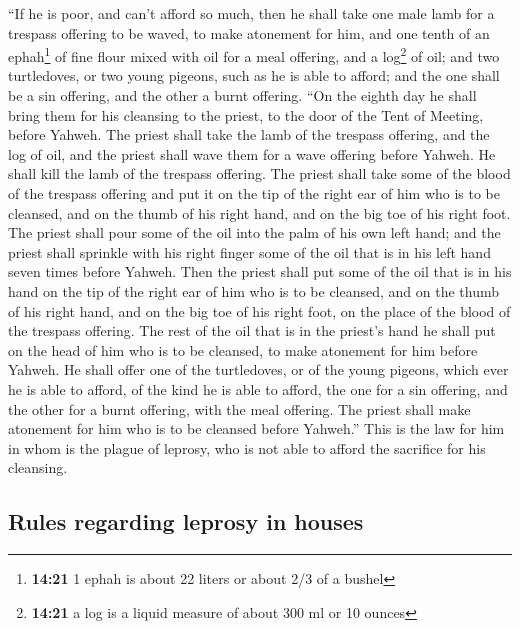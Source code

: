  ``If he is poor, and can't afford so much, then he shall
take one male lamb for a trespass offering to be waved, to make
atonement for him, and one tenth of an ephah\footnote{\textbf{14:21} 1
  ephah is about 22 liters or about 2/3 of a bushel} of fine flour mixed
with oil for a meal offering, and a log\footnote{\textbf{14:21} a log is
  a liquid measure of about 300 ml or 10 ounces} of oil; 
and two turtledoves, or two young pigeons, such as he is able to afford;
and the one shall be a sin offering, and the other a burnt offering.
 ``On the eighth day he shall bring them for his
cleansing to the priest, to the door of the Tent of Meeting, before
Yahweh.  The priest shall take the lamb of the trespass
offering, and the log of oil, and the priest shall wave them for a wave
offering before Yahweh.  He shall kill the lamb of the
trespass offering. The priest shall take some of the blood of the
trespass offering and put it on the tip of the right ear of him who is
to be cleansed, and on the thumb of his right hand, and on the big toe
of his right foot.  The priest shall pour some of the oil
into the palm of his own left hand;  and the priest shall
sprinkle with his right finger some of the oil that is in his left hand
seven times before Yahweh.  Then the priest shall put
some of the oil that is in his hand on the tip of the right ear of him
who is to be cleansed, and on the thumb of his right hand, and on the
big toe of his right foot, on the place of the blood of the trespass
offering.  The rest of the oil that is in the priest's
hand he shall put on the head of him who is to be cleansed, to make
atonement for him before Yahweh.  He shall offer one of
the turtledoves, or of the young pigeons, which ever he is able to
afford,  of the kind he is able to afford, the one for a
sin offering, and the other for a burnt offering, with the meal
offering. The priest shall make atonement for him who is to be cleansed
before Yahweh.''  This is the law for him in whom is the
plague of leprosy, who is not able to afford the sacrifice for his
cleansing.

\hypertarget{rules-regarding-leprosy-in-houses}{%
\subsection{Rules regarding leprosy in
houses}\label{rules-regarding-leprosy-in-houses}}

